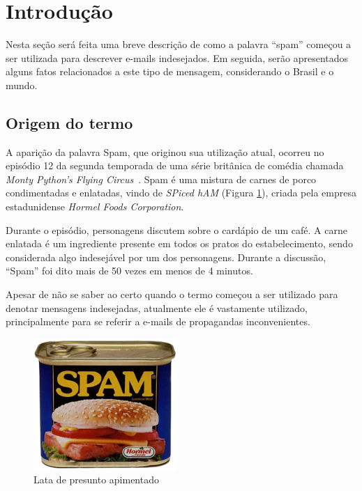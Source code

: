 \documentclass[a4paper,dvipdfm]{article}
\begin{document}
\newpage

\tableofcontents
\newpage

\section{Introdução}
	Nesta seção será feita uma breve descrição de como a palavra ``spam'' começou a ser utilizada para descrever e-mails indesejados.
	Em seguida, serão apresentados alguns fatos relacionados a este tipo de mensagem, considerando o Brasil e o mundo.

	\subsection{Origem do termo}
		A aparição da palavra Spam, que originou sua utilização atual, ocorreu no episódio 12 da segunda temporada de uma série britânica de comédia chamada \emph{Monty Python's Flying Circus}~\cite{montyPython:fc, mpyt}. 
		Spam é uma mistura de carnes de porco condimentadas e enlatadas, vindo de \emph{SPiced hAM} (Figura \ref{fig:spam}), criada pela empresa estadunidense \emph{Hormel Foods Corporation}.

		Durante o episódio, personagens discutem sobre o cardápio de um café. 
		A carne enlatada é um ingrediente presente em todos os pratos do estabelecimento, sendo considerada algo indesejável por um dos personagens. 
		Durante a discussão, ``Spam'' foi dito mais de 50 vezes em menos de 4 minutos.

		Apesar de não se saber ao certo quando o termo começou a ser utilizado para denotar mensagens indesejadas, atualmente ele é vastamente utilizado, principalmente para  se referir a e-mails de propagandas inconvenientes.
		
		\begin{figure}[ht]
			\centering
			\includegraphics [height=5cm]{Imagens/spam/spam.png}
			\caption{Lata de presunto apimentado}
			\label{fig:spam}
		\end{figure}
\end{document}
